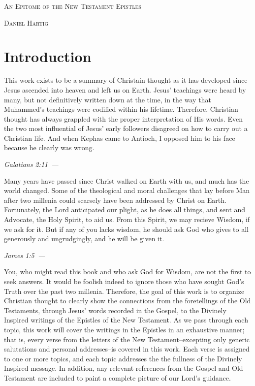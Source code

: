 \documentclass[10pt]{article}
\let\oldquote\quote
\let\endoldquote\endquote
\renewenvironment{quote}[2][]
  {\if\relax\detokenize{#1}\relax
     \def\quoteauthor{#2}%
   \else
     \def\quoteauthor{#2~---~#1}%
   \fi
   \oldquote}
  {\par\nobreak\smallskip\hfill\textit{\quoteauthor}%
   \endoldquote\addvspace{\bigskipamount}}
\begin{document}
\begin{titlepage}\centering
{\scshape\huge An Epitome of the New Testament Epistles \par}
\vfill
{\scshape\large Daniel Hartig \par}
\vfill
\end{titlepage}
\singlespace
\section*{Introduction}

This work exists to be a summary of Christain thought as it has developed since Jesus ascended into heaven and left us on Earth. Jesus' teachings were heard by many, but not definitively written down at the time, in the way that Muhammed's teachings were codified within his lifetime. Therefore, Christian thought has always grappled with the proper interpretation of His words. Even the two most influential of Jesus' early followers disagreed on how to carry out a Christian life.
\begin{quote}{Galatians 2:11}
And when Kephas came to Antioch, I opposed him to his face because he clearly was wrong.
\end{quote}

Many years have passed since Christ walked on Earth with us, and much has the world changed. Some of the theological and moral challenges that lay before Man after two millenia could scarsely have been addressed by Christ on Earth. Fortunately, the Lord anticipated our plight, as he does all things, and sent and Advocate, the Holy Spirit, to aid us. From this Spirit, we may recieve Wisdom, if we ask for it.
\begin{quote}{James 1:5}
But if any of you lacks wisdom, he should ask God who gives to all generously and ungrudgingly, and he will be given it.
\end{quote}

You, who might read this book and who ask God for Wisdom, are not the first to seek answers. It would be foolish indeed to ignore those who have sought God's Truth over the past two millenia. Therefore, the goal of this work is to organize Christian thought to clearly show the connections from the foretellings of the Old Testaments, through Jesus' words recorded in the Gospel, to the Divinely Inspired writings of the Epistles of the New Testament. As we pass through each topic, this work will cover the writings in the Epistles in an exhaustive manner; that is, every verse from the letters of the New Testament--excepting only generic salutations and personal addresses--is covered in this work. Each verse is assigned to one or more topics, and each topic addresses the the fullness of the Divinely Inspired message. In addition, any relevant references from the Gospel and Old Testament are included to paint a complete picture of our Lord's guidance.
\end{document}

